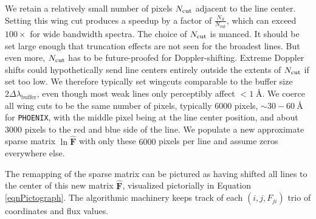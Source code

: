 \documentclass[twocolumn]{aastex631}
\begin{document}
We retain a relatively small number of pixels $N_{\rm cut}$ adjacent to the line center. Setting this wing cut produces a speedup by a factor of $\frac{N_S}{N_{\mathrm{cut}}}$, which can exceed $100\times$ for wide bandwidth spectra. The choice of $N_{\rm cut}$ is nuanced.  It should be set large enough that truncation effects are not seen for the broadest lines.  But even more, $N_{\rm cut}$ has to be future-proofed for Doppler-shifting. Extreme Doppler shifts could hypothetically send line centers entirely outside the extents of $N_{\rm cut}$ if set too low.  We therefore typically set wingcuts comparable to the buffer size $2 \Delta \lambda_{\mathrm{buffer}}$, even though most weak lines only perceptibly affect $<1\;$\AA. We coerce all wing cuts to be the same number of pixels, typically 6000 pixels, $\sim30-60~$\AA~ for \texttt{PHOENIX}, with the middle pixel being at the line center position, and about 3000 pixels to the red and blue side of the line. We populate a new approximate sparse matrix $\ln{\bm{\hat{F}}}$ with only these $6000$ pixels per line and assume zeros everywhere else.

The remapping of the sparse matrix can be pictured as having shifted all lines to the center of this new matrix $\bm{\hat{F}}$, visualized pictorially in Equation \ref{eqnPictograph}.  The algorithmic machinery keeps track of each $(i, j, F_{ji})$ trio of coordinates and flux values.
\end{document}
